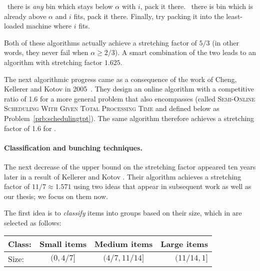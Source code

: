 \begin{algorithm}
\caption{}
\begin{algorithmic}[1]
\State \algorithmicif\ there is \emph{any} bin which stays below $\alpha$ with $i$, pack it there.
\State \algorithmicif\ there is bin which is already above $\alpha$ and $i$ fits, pack it there.
\State Finally, try packing it into the least-loaded machine where $i$ fits.
\EndFor 
\end{algorithmic}
\end{algorithm}

Both of these algorithms actually achieve a stretching factor of $5/3$
(in other words, they never fail when $\alpha \ge 2/3$). A smart
combination of the two leads to an algorithm with stretching factor
$1.625$.

The next algorithmic progress came as a consequence of the work of
Cheng, Kellerer and Kotov in 2005~\cite{cheng05}. They design an
online algorithm with a competitive ratio of 1.6 for a more general
problem that also encompasses \binstretch (called \textsc{Semi-Online
Scheduling With Given Total Processing Time} and defined below as
Problem~\ref{prb:schedulingtpt}). The same algorithm therefore
achieves a stretching factor of 1.6 for \binstretch.

\paragraph{Classification and bunching techniques.} The next decrease
of the upper bound on the stretching factor appeared ten years later
in a result of Kellerer and Kotov \cite{kellerer2013}. Their algorithm
achieves a stretching factor of $11/7 \approx 1.571$ using two ideas
that appear in subsequent work as well as our thesis; we focus on them
now.


The first idea is to \emph{classify} items into groups based on their
size, which in \cite{kellerer2013} are selected as follows:

\begin{center}
  \begin{tabular}{ l | c | c | r }
    Class: & Small items & Medium items   & Large items \\ \hline
    Size: & $(0,4/7]$   & $(4/7, 11/14]$ & $(11/14,1]$ \\ 
  \end{tabular}
\end{center}

